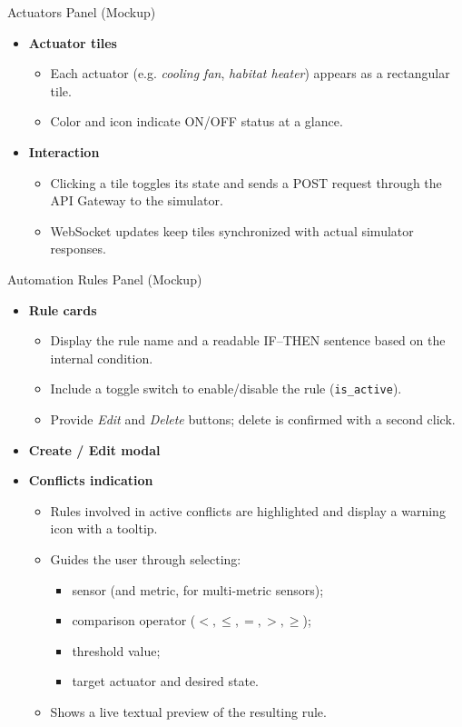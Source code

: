 \documentclass[aspectratio=169]{beamer}
\begin{document}
\begin{frame}[t]{Actuators Panel (Mockup)}
  \small
  \begin{itemize}
    \item \textbf{Actuator tiles}
      \begin{itemize}
        \item Each actuator (e.g. \emph{cooling fan}, \emph{habitat heater}) appears as a rectangular tile.
        \item Color and icon indicate ON/OFF status at a glance.
      \end{itemize}
    \item \textbf{Interaction}
      \begin{itemize}
          \item Clicking a tile toggles its state and sends a POST request through the API Gateway to the simulator.
          \item WebSocket updates keep tiles synchronized with actual simulator responses.
      \end{itemize}
  \end{itemize}
\end{frame}

\begin{frame}[t]{Automation Rules Panel (Mockup)}
  \small
  \begin{itemize}
    \item \textbf{Rule cards}
      \begin{itemize}
        \item Display the rule name and a readable IF--THEN sentence based on the internal condition.
        \item Include a toggle switch to enable/disable the rule (\texttt{is\_active}).
        \item Provide \emph{Edit} and \emph{Delete} buttons; delete is confirmed with a second click.
      \end{itemize}
    \item \textbf{Create / Edit modal}
    \item \textbf{Conflicts indication}
      \begin{itemize}
        \item Rules involved in active conflicts are highlighted and display a warning icon with a tooltip.
      \end{itemize}
      \begin{itemize}
        \item Guides the user through selecting:
          \begin{itemize}
            \item sensor (and metric, for multi-metric sensors);
            \item comparison operator (\(<, \leq, =, >, \geq\));
            \item threshold value;
            \item target actuator and desired state.
          \end{itemize}
        \item Shows a live textual preview of the resulting rule.
      \end{itemize}
  \end{itemize}
\end{frame}
\end{document}
